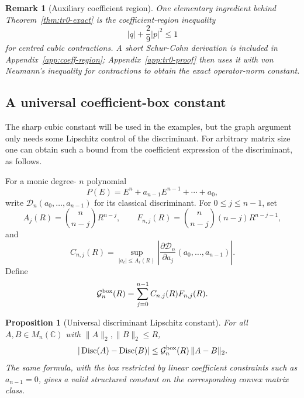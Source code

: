 \documentclass[11pt]{article}
\newtheorem{proposition}[theorem]{Proposition}
\newtheorem{remark}[theorem]{Remark}
\numberwithin{equation}{section}
\DeclareMathOperator{\Disc}{Disc}
\begin{document}
\begin{remark}[Auxiliary coefficient region]
One elementary ingredient behind Theorem~\ref{thm:tr0-exact} is the
coefficient-region inequality
\[
  |q|+\frac{2}{9}|p|^2\le1
\]
for centred cubic contractions.  A short Schur-Cohn derivation is included
in Appendix~\ref{app:coeff-region}; Appendix~\ref{app:tr0-proof} then uses
it with von Neumann's inequality for contractions to obtain the exact
operator-norm constant.
\end{remark}


\subsection{A universal coefficient-box constant}
The sharp cubic constant will be used in the examples, but the graph
argument only needs some Lipschitz control of the discriminant.  For arbitrary
matrix size one can obtain such a bound from the coefficient expression of
the discriminant, as follows.

For a monic degree-
\(n\) polynomial
\[
  P(E)=E^n+a_{n-1}E^{n-1}+\cdots+a_0,
\]
write \(\mathcal D_n(a_0,\ldots,a_{n-1})\) for its classical discriminant.
For \(0\le j\le n-1\), set
\[
  A_j(R)=\binom n{n-j}R^{n-j},
  \qquad
  F_{n,j}(R)=\binom n{n-j}(n-j)R^{n-j-1},
\]
and
\[
  C_{n,j}(R)=
  \sup_{|a_\ell|\le A_\ell(R)}
  \left|\frac{\partial \mathcal D_n}{\partial a_j}(a_0,\ldots,a_{n-1})\right|.
\]
Define
\[
  \mathcal G^{\rm box}_n(R)=\sum_{j=0}^{n-1}C_{n,j}(R)F_{n,j}(R).
\]

\begin{proposition}[Universal discriminant Lipschitz constant]\label{prop:general-box-Gn}
For all \(A,B\in M_n(\mathbb C)\) with
\(\|A\|_2,\|B\|_2\le R\),
\[
  |\Disc(A)-\Disc(B)|\le
  \mathcal G^{\rm box}_n(R)\,\|A-B\|_2 .
\]
The same formula, with the box restricted by linear coefficient constraints
such as \(a_{n-1}=0\), gives a valid structured constant on the corresponding
convex matrix class.
\end{proposition}
\end{document}
